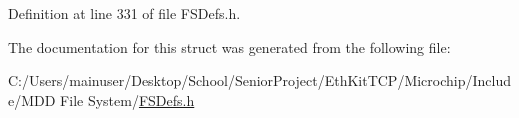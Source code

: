 Definition at line 331 of file F\+S\+Defs.\+h.



The documentation for this struct was generated from the following file\+:\begin{DoxyCompactItemize}
\item 
C\+:/\+Users/mainuser/\+Desktop/\+School/\+Senior\+Project/\+Eth\+Kit\+T\+C\+P/\+Microchip/\+Include/\+M\+D\+D File System/\hyperlink{_f_s_defs_8h}{F\+S\+Defs.\+h}\end{DoxyCompactItemize}
